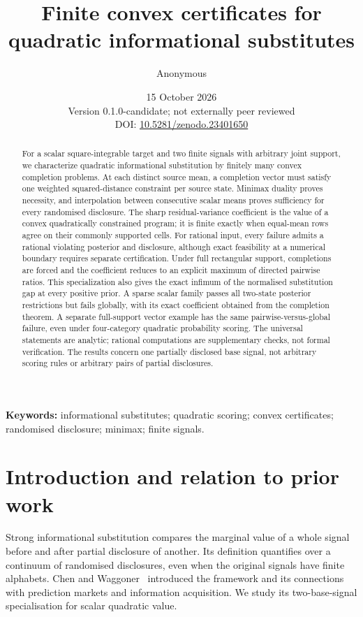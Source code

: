 \documentclass[11pt,a4paper]{article}
\title{Finite convex certificates for quadratic informational substitutes}
\author{Anonymous}
\date{15 October 2026\\\small Version 0.1.0-candidate; not externally peer reviewed\\
\small DOI: \href{https://doi.org/10.5281/zenodo.23401650}{10.5281/zenodo.23401650}}
\begin{document}
\maketitle
\begin{abstract}
For a scalar square-integrable target and two finite signals with arbitrary joint support, we characterize quadratic informational substitution by finitely many convex completion problems. At each distinct source mean, a completion vector must satisfy one weighted squared-distance constraint per source state. Minimax duality proves necessity, and interpolation between consecutive scalar means proves sufficiency for every randomised disclosure. The sharp residual-variance coefficient is the value of a convex quadratically constrained program; it is finite exactly when equal-mean rows agree on their commonly supported cells. For rational input, every failure admits a rational violating posterior and disclosure, although exact feasibility at a numerical boundary requires separate certification. Under full rectangular support, completions are forced and the coefficient reduces to an explicit maximum of directed pairwise ratios. This specialization also gives the exact infimum of the normalised substitution gap at every positive prior. A sparse scalar family passes all two-state posterior restrictions but fails globally, with its exact coefficient obtained from the completion theorem. A separate full-support vector example has the same pairwise-versus-global failure, even under four-category quadratic probability scoring. The universal statements are analytic; rational computations are supplementary checks, not formal verification. The results concern one partially disclosed base signal, not arbitrary scoring rules or arbitrary pairs of partial disclosures.
\end{abstract}
\noindent\textbf{Keywords:} informational substitutes; quadratic scoring; convex certificates; randomised disclosure; minimax; finite signals.

\section{Introduction and relation to prior work}
Strong informational substitution compares the marginal value of a whole signal before and after partial disclosure of another. Its definition quantifies over a continuum of randomised disclosures, even when the original signals have finite alphabets. Chen and Waggoner~\cite{CW} introduced the framework and its connections with prediction markets and information acquisition. We study its two-base-signal specialisation for scalar quadratic value.
\end{document}

